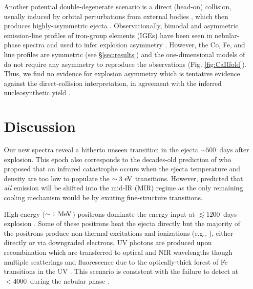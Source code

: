 \documentclass[twocolumn]{aastex63}
\begin{document}
Another potential double-degenerate scenario is a direct (head-on) collision, usually induced by orbital perturbations from external bodies \citep[e.g., ][]{thompson2011, antognini2014}, which then produces highly-asymmetric ejecta \citep[e.g., ][]{rosswog2009, vanrossum2016}. Observationally, bimodal and asymmetric emission-line profiles of iron-group elements (IGEs) have been seen in nebular-phase \sneia spectra and used to infer explosion asymmetry \citep[e.g., ][]{dong2015, mazzali2018, vallely2020, hoeflich2021}. However, the Co, Fe, and \CaII line profiles are symmetric (see \S\ref{sec:results}) and the one-dimensional models of \citet{fransson2015} do not require any asymmetry to reproduce the observations (Fig. \ref{fig:CaIIfold}). Thus, we find no evidence for explosion asymmetry which is tentative evidence against the direct-collision interpretation, in agreement with the inferred nucleosynthetic yield \citep{tucker2021c}.


\section{Discussion}\label{sec:discuss}

Our new spectra reveal a hitherto unseen transition in the ejecta $\sim 500$~days after explosion. This epoch also corresponds to the decades-old prediction of \citet{axelrod1980} who proposed that an infrared catastrophe occurs when the ejecta temperature and density are too low to populate the $\sim 3~\rm{eV}$  transitions. However, \citet{axelrod1980} predicted that \textit{all} emission will be shifted into the mid-IR (MIR) regime as the only remaining cooling mechanism would be by exciting fine-structure transitions. 

High-energy ($\sim 1~\rm{MeV}$)  positrons dominate the energy input at $\lesssim 1200$~days explosion \citep[e.g., ][]{tucker2021c}. Some of these positrons heat the ejecta directly but the majority of the positrons produce non-thermal excitations and ionizations (e.g., \citealp{kozma1992, jerkstrand2011, li2012, shingles2020}), either directly or via downgraded electrons. UV photons are produced upon recombination which are transferred to optical and NIR wavelengths though multiple scatterings and fluorescence due to the optically-thick forest of Fe transitions in the UV \citep[e.g., ][]{pinto2000, jerkstrand2011, fransson2015}. This scenario is consistent with the failure to detect \name at $< 4000$~\AAA during the nebular phase \citep{kerzendorf2017}. 
\end{document}

